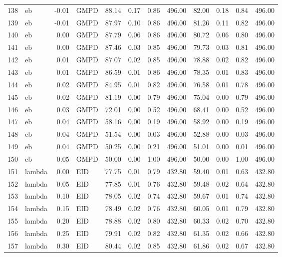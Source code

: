 \begin{table}[ht]
\begin{tabular}{rlrlrrrrrrrr}
  138 & eb & -0.01 & GMPD & 88.14 & 0.17 & 0.86 & 496.00 & 82.00 & 0.18 & 0.84 & 496.00 \\ 
  139 & eb & -0.01 & GMPD & 87.97 & 0.10 & 0.86 & 496.00 & 81.26 & 0.11 & 0.82 & 496.00 \\ 
  140 & eb & 0.00 & GMPD & 87.79 & 0.06 & 0.86 & 496.00 & 80.72 & 0.06 & 0.80 & 496.00 \\ 
  141 & eb & 0.00 & GMPD & 87.46 & 0.03 & 0.85 & 496.00 & 79.73 & 0.03 & 0.81 & 496.00 \\ 
  142 & eb & 0.01 & GMPD & 87.07 & 0.02 & 0.85 & 496.00 & 78.88 & 0.02 & 0.82 & 496.00 \\ 
  143 & eb & 0.01 & GMPD & 86.59 & 0.01 & 0.86 & 496.00 & 78.35 & 0.01 & 0.83 & 496.00 \\ 
  144 & eb & 0.02 & GMPD & 84.95 & 0.01 & 0.82 & 496.00 & 76.58 & 0.01 & 0.78 & 496.00 \\ 
  145 & eb & 0.02 & GMPD & 81.19 & 0.00 & 0.79 & 496.00 & 75.04 & 0.00 & 0.79 & 496.00 \\ 
  146 & eb & 0.03 & GMPD & 72.01 & 0.00 & 0.52 & 496.00 & 68.41 & 0.00 & 0.52 & 496.00 \\ 
  147 & eb & 0.04 & GMPD & 58.16 & 0.00 & 0.19 & 496.00 & 58.92 & 0.00 & 0.19 & 496.00 \\ 
  148 & eb & 0.04 & GMPD & 51.54 & 0.00 & 0.03 & 496.00 & 52.88 & 0.00 & 0.03 & 496.00 \\ 
  149 & eb & 0.04 & GMPD & 50.25 & 0.00 & 0.21 & 496.00 & 51.01 & 0.00 & 0.01 & 496.00 \\ 
  150 & eb & 0.05 & GMPD & 50.00 & 0.00 & 1.00 & 496.00 & 50.00 & 0.00 & 1.00 & 496.00 \\ 
  151 & lambda & 0.00 & EID & 77.75 & 0.01 & 0.79 & 432.80 & 59.40 & 0.01 & 0.63 & 432.80 \\ 
  152 & lambda & 0.05 & EID & 77.85 & 0.01 & 0.76 & 432.80 & 59.48 & 0.02 & 0.64 & 432.80 \\ 
  153 & lambda & 0.10 & EID & 78.05 & 0.02 & 0.74 & 432.80 & 59.67 & 0.01 & 0.74 & 432.80 \\ 
  154 & lambda & 0.15 & EID & 78.49 & 0.02 & 0.76 & 432.80 & 60.05 & 0.01 & 0.79 & 432.80 \\ 
  155 & lambda & 0.20 & EID & 78.88 & 0.02 & 0.80 & 432.80 & 60.33 & 0.02 & 0.70 & 432.80 \\ 
  156 & lambda & 0.25 & EID & 79.91 & 0.02 & 0.82 & 432.80 & 61.35 & 0.02 & 0.66 & 432.80 \\ 
  157 & lambda & 0.30 & EID & 80.44 & 0.02 & 0.85 & 432.80 & 61.86 & 0.02 & 0.67 & 432.80 \\ 

\end{tabular}
\end{table}
